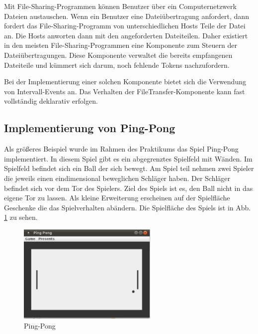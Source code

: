 Mit File-Sharing-Programmen können Benutzer über ein Computernetzwerk
Dateien austauschen. Wenn ein Benutzer eine Dateiübertragung anfordert, dann
fordert das File-Sharing-Programm von unterschiedlichen Hosts Teile der Datei
an. Die Hosts anworten dann mit den angeforderten Dateiteilen. Daher existiert
in den meisten File-Sharing-Programmen eine Komponente zum Steuern der
Dateiübertragungen. Diese Komponente verwaltet die bereits empfangenen
Dateiteile und kümmert sich darum, noch fehlende Tokens nachzufordern.

Bei der Implementierung einer solchen Komponente bietet sich die Verwendung von
Intervall-Events an. Das Verhalten der FileTransfer-Komponente kann fast
vollständig deklarativ erfolgen. 

\subsection{Implementierung von Ping-Pong}
Als größeres Beispiel wurde im Rahmen des Praktikums das Spiel
Ping-Pong implementiert. In diesem Spiel gibt es ein abgegrenztes Spielfeld mit
Wänden. Im Spielfeld befindet sich ein Ball der sich bewegt. Am Spiel teil
nehmen zwei Spieler die jeweils einen eindimensional beweglichen Schläger haben.
Der Schläger befindet sich vor dem Tor des Spielers. Ziel des Spiels ist es, den
Ball nicht in das eigene Tor zu lassen. Als kleine Erweiterung erscheinen auf
der Spielfläche Geschenke die das Spielverhalten abändern. Die Spielfläche des
Spiels ist in Abb. \ref{ping_pong} zu sehen.

\begin{figure}[htp]
\begin{center}
  \includegraphics[width=0.6\textwidth]{graphics/pingpong.eps}
  \caption{Ping-Pong}
  \label{ping_pong}
\end{center}
\end{figure}

